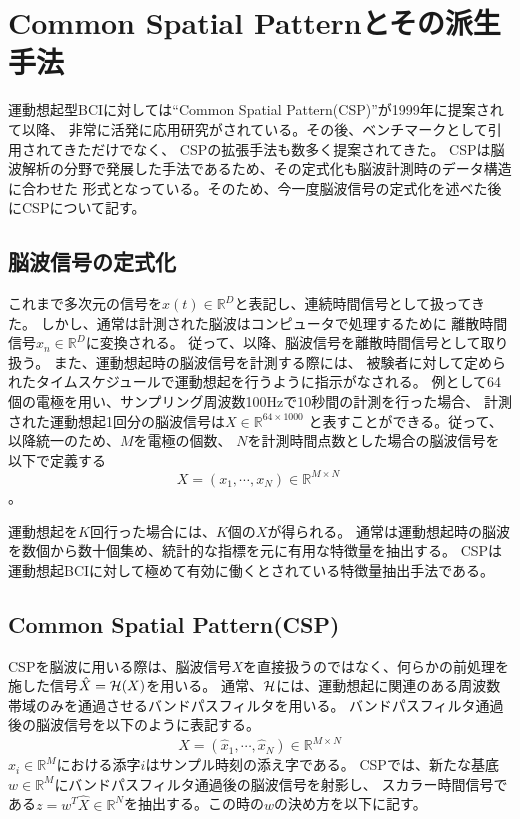 


\section{Common Spatial Patternとその派生手法}
運動想起型BCIに対しては``Common Spatial Pattern(CSP)''\cite{csp}が1999年に提案されて以降、
非常に活発に応用研究がされている。その後、ベンチマークとして引用されてきただけでなく、
CSPの拡張手法も数多く提案されてきた。
CSPは脳波解析の分野で発展した手法であるため、その定式化も脳波計測時のデータ構造に合わせた
形式となっている。そのため、今一度脳波信号の定式化を述べた後にCSPについて記す。

\subsection{脳波信号の定式化}
これまで多次元の信号を\(x(t)\in \mathbb R^D\)と表記し、連続時間信号として扱ってきた。
しかし、通常は計測された脳波はコンピュータで処理するために
離散時間信号\(x_n \in \mathbb R^D\)に変換される。
従って、以降、脳波信号を離散時間信号として取り扱う。
また、運動想起時の脳波信号を計測する際には、
被験者に対して定められたタイムスケジュールで運動想起を行うように指示がなされる。
例として64個の電極を用い、サンプリング周波数100Hzで10秒間の計測を行った場合、
計測された運動想起1回分の脳波信号は\(X \in \mathbb{R}^{64 \times 1000}\)
と表すことができる。従って、以降統一のため、\(M\)を電極の個数、
\(N\)を計測時間点数とした場合の脳波信号を以下で定義する\begin{equation}
    X =(x_1, \cdots, x_N)\in \mathbb{R}^{M \times N}\    
\end{equation}。


運動想起を\(K\)回行った場合には、\(K\)個の\(X\)が得られる。
通常は運動想起時の脳波を数個から数十個集め、統計的な指標を元に有用な特徴量を抽出する。
CSPは運動想起BCIに対して極めて有効に働くとされている特徴量抽出手法である。


\subsection{Common Spatial Pattern(CSP)}
\label{subsec:CSP}

CSPを脳波に用いる際は、脳波信号\(X\)を直接扱うのではなく、何らかの前処理を施した信号\(\hat{X} = {\cal H}(X) \)を用いる。
通常、\(\cal H\)には、運動想起に関連のある周波数帯域のみを通過させるバンドパスフィルタを用いる。
バンドパスフィルタ通過後の脳波信号を以下のように表記する。
\begin{equation}
    \hat X = \left( \hat x_1,\cdots,\hat x_N \right) \in \mathbb{R}^{M \times N}
\end{equation}
\(\hat x_i \in \mathbb R^M\)における添字\(i\)はサンプル時刻の添え字である。
CSPでは、新たな基底\(w\in \mathbb R^M\)にバンドパスフィルタ通過後の脳波信号を射影し、
スカラー時間信号である\(z=w^T\hat X\in \mathbb R^N\)を抽出する。この時の\(w\)の決め方を以下に記す。

